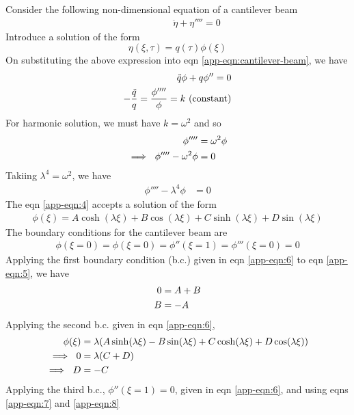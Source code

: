 \documentclass[12pt]{report}
\begin{document}
Consider the following non-dimensional equation of a cantilever beam 
\begin{align}
  \qquad\qquad \ddot{\eta} + \eta'''' = 0 \label{app-eqn:cantilever-beam}
\end{align}
Introduce a solution of the form \cite{meirovitch}
$$\eta (\xi, \tau) = q (\tau) \phi (\xi)$$
On substituting the above expression into eqn \ref{app-eqn:cantilever-beam}, we have
\begin{align}
   \ddot{q}\phi + q\phi'' = 0 \notag \\
    -\frac{\ddot{q}}{q} = \frac{\phi''''}{\phi}  = k ~(\text{constant}) \label{app-eqn:2}
\end{align}
For harmonic solution, we must have $k = \omega^2$  and so
\begin{align}
 \phi'''' &= \omega^2 \phi  \notag  \\
 \implies ~\phi'''' - \omega^2 \phi &= 0 \label{app-eqn:3}
\end{align}
Takiing $\lambda^4 = \omega^2$, we have
\begin{align}
  \phi'''' - \lambda^4 \phi &= 0 \label{app-eqn:4}
\end{align}
The eqn \ref{app-eqn:4} accepts a solution of the form 
\begin{align}
  \phi(\xi) = A \cosh (\lambda \xi) + B \cos (\lambda \xi) + C\sinh(\lambda \xi) + D\sin(\lambda \xi) \label{app-eqn:5}
\end{align}
The boundary conditions for the cantilever beam are
\begin{align}
 \phi(\xi = 0) = \phi(\xi = 0) = \phi''(\xi = 1) = \phi''' (\xi = 0) = 0 \label{app-eqn:6}
\end{align}
Applying the first boundary condition (b.c.) given in eqn \ref{app-eqn:6} to eqn \ref{app-eqn:5}, we have
\begin{align}
       0 &= A + B \notag \\
       B &= - A \label{app-eqn:7}
\end{align}
Applying the second b.c. given in eqn \ref{app-eqn:6}, 
\begin{align}
  \phi(\xi) &= \lambda (A \sinh (\lambda \xi) - B \sin (\lambda \xi) + C\cosh(\lambda \xi) + D\cos(\lambda \xi))  \notag  \\
  \implies~ 0 &= \lambda (C + D) \notag \\
  \implies~ D &= -C \label{app-eqn:8}
\end{align}
Applying the third b.c., $\phi''(\xi = 1) = 0$, given in eqn \ref{app-eqn:6}, and using eqns \ref{app-eqn:7} and \ref{app-eqn:8}
\end{document}

